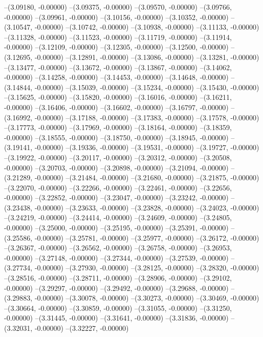 --(3.09180, -0.00000)
--(3.09375, -0.00000)
--(3.09570, -0.00000)
--(3.09766, -0.00000)
--(3.09961, -0.00000)
--(3.10156, -0.00000)
--(3.10352, -0.00000)
--(3.10547, -0.00000)
--(3.10742, -0.00000)
--(3.10938, -0.00000)
--(3.11133, -0.00000)
--(3.11328, -0.00000)
--(3.11523, -0.00000)
--(3.11719, -0.00000)
--(3.11914, -0.00000)
--(3.12109, -0.00000)
--(3.12305, -0.00000)
--(3.12500, -0.00000)
--(3.12695, -0.00000)
--(3.12891, -0.00000)
--(3.13086, -0.00000)
--(3.13281, -0.00000)
--(3.13477, -0.00000)
--(3.13672, -0.00000)
--(3.13867, -0.00000)
--(3.14062, -0.00000)
--(3.14258, -0.00000)
--(3.14453, -0.00000)
--(3.14648, -0.00000)
--(3.14844, -0.00000)
--(3.15039, -0.00000)
--(3.15234, -0.00000)
--(3.15430, -0.00000)
--(3.15625, -0.00000)
--(3.15820, -0.00000)
--(3.16016, -0.00000)
--(3.16211, -0.00000)
--(3.16406, -0.00000)
--(3.16602, -0.00000)
--(3.16797, -0.00000)
--(3.16992, -0.00000)
--(3.17188, -0.00000)
--(3.17383, -0.00000)
--(3.17578, -0.00000)
--(3.17773, -0.00000)
--(3.17969, -0.00000)
--(3.18164, -0.00000)
--(3.18359, -0.00000)
--(3.18555, -0.00000)
--(3.18750, -0.00000)
--(3.18945, -0.00000)
--(3.19141, -0.00000)
--(3.19336, -0.00000)
--(3.19531, -0.00000)
--(3.19727, -0.00000)
--(3.19922, -0.00000)
--(3.20117, -0.00000)
--(3.20312, -0.00000)
--(3.20508, -0.00000)
--(3.20703, -0.00000)
--(3.20898, -0.00000)
--(3.21094, -0.00000)
--(3.21289, -0.00000)
--(3.21484, -0.00000)
--(3.21680, -0.00000)
--(3.21875, -0.00000)
--(3.22070, -0.00000)
--(3.22266, -0.00000)
--(3.22461, -0.00000)
--(3.22656, -0.00000)
--(3.22852, -0.00000)
--(3.23047, -0.00000)
--(3.23242, -0.00000)
--(3.23438, -0.00000)
--(3.23633, -0.00000)
--(3.23828, -0.00000)
--(3.24023, -0.00000)
--(3.24219, -0.00000)
--(3.24414, -0.00000)
--(3.24609, -0.00000)
--(3.24805, -0.00000)
--(3.25000, -0.00000)
--(3.25195, -0.00000)
--(3.25391, -0.00000)
--(3.25586, -0.00000)
--(3.25781, -0.00000)
--(3.25977, -0.00000)
--(3.26172, -0.00000)
--(3.26367, -0.00000)
--(3.26562, -0.00000)
--(3.26758, -0.00000)
--(3.26953, -0.00000)
--(3.27148, -0.00000)
--(3.27344, -0.00000)
--(3.27539, -0.00000)
--(3.27734, -0.00000)
--(3.27930, -0.00000)
--(3.28125, -0.00000)
--(3.28320, -0.00000)
--(3.28516, -0.00000)
--(3.28711, -0.00000)
--(3.28906, -0.00000)
--(3.29102, -0.00000)
--(3.29297, -0.00000)
--(3.29492, -0.00000)
--(3.29688, -0.00000)
--(3.29883, -0.00000)
--(3.30078, -0.00000)
--(3.30273, -0.00000)
--(3.30469, -0.00000)
--(3.30664, -0.00000)
--(3.30859, -0.00000)
--(3.31055, -0.00000)
--(3.31250, -0.00000)
--(3.31445, -0.00000)
--(3.31641, -0.00000)
--(3.31836, -0.00000)
--(3.32031, -0.00000)
--(3.32227, -0.00000)
